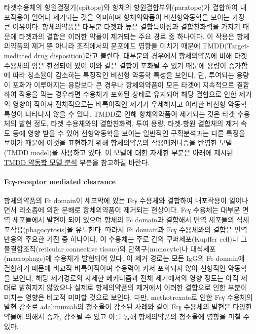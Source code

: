\documentclass[
  11pt,
  krantz2, a4paper, twoside]{krantz}
\theoremstyle{definition}
\theoremstyle{definition}
\theoremstyle{definition}
\theoremstyle{definition}
\theoremstyle{remark}
\begin{document}
타겟수용체의 항원결정기(epitope)와 항체의 항원결합부위(paratope)가 결합하여 내포작용이 일어나 제거되는 것을 의미하며 항체의약품이 비선형약동학을 보이는 가장 큰 이유이다. 항체의약품은 대부분 타겟과 높은 결합특이성과 결합친화력을 가지기 때문에 타겟과의 결합은 이러한 약물이 제거되는 주요 경로 중 하나이다. 이 작용은 항체의약품의 제거 뿐 아니라 조직에서의 분포에도 영향을 미치기 때문에 TMDD(Target-mediated drug disposition)라고 불린다.    
대부분의 경우에서 항체의약품에 비해 타겟수용체의 양은 한정되어 있어 이와 같은 결합이 포화될 수 있기 때문에 용량이 증가함에 따라 청소율이 감소하는 특징적인 비선형 약동학 특성을 보인다. 단, 투여되는 용량이 포화가 이루어지는 용량보다 큰 경우나 항체의약품이 모든 타겟에 지속적으로 결합하여 작용을 막는 경우라면 수용체가 포화된 상태로 유지되어 해당 결합으로 인한 제거의 영향이 작아져 전체적으로는 비특이적인 제거가 우세해지고 이러한 비선형 약동학 특성이 나타나지 않을 수 있다. 
TMDD로 인해 항체의약품이 제거되는 것은 타겟 수용체의 발현 정도, 타겟 수용체와의 결합친화력, 투여 용량, 타겟-항원 결합체의 제거 속도 등에 영향 받을 수 있어 선형약동학을 보이는 일반적인 구획분석과는 다른 특징을 보이기 때문에 이것을 표현하기 위해 항체의약품의 작용메커니즘을 반영한 모델(TMDD model)을 사용하고 있다. 이 모델에 대한 자세한 부분은 아래에 제시된 \hyperref[tmdd_model]{TMDD 약동학 모델 분석} 부분을 참고하길 바란다.

\paragraph{Fcγ-receptor mediated clearance}\label{fcux3b3-receptor-mediated-clearance}

항체의약품의 Fc domain이 세포막에 있는 Fcγ 수용체와 결합하여 내포작용이 일어나면서 리소좀에 의한 분해로 항체의약품이 제거되는 현상이다. Fcγ 수용체는 대부분 면역 세포들에서 발현이 되어 있으며 항체의 Fc domain과 결합해서 면역 세포들의 식세포작용(phagocytosis)을 유도한다. 따라서 Fc domain과 Fcγ 수용체와의 결합은 면역 반응의 주요한 기전 중 하나이다.
이 수용체는 주로 간의 쿠퍼세포(Kupffer cell)나 그물결합조직(reticular connective tissue)의 단핵구(monocyte)나 대식세포(macrophage)에 수용체가 발현되어 있다. 이 제거 경로는 모든 IgG의 Fc domain에 결합하기 때문에 비교적 비특이적이며 수용력이 커서 포화되지 않아 선형적인 약동학을 보인다. 해당 제거경로의 자세한 메커니즘과 전체 제거에서의 영향 정도는 아직 제대로 밝혀지지 않았으나 실제로 항체의약품의 제거에서 이러한 결합으로 인한 부분이 미치는 영향은 비교적 미미할 것으로 보인다. 다만, methotrexate로 인한 Fcγ 수용체의 발현 감소로 adalimumab의 청소율이 감소된 사례와 같이 Fcγ 수용체의 발현은 다양한 약물에 의해서 증가, 감소될 수 있고 이를 통해 항체의약품의 청소율에 영향을 미칠 수 있다.
\end{document}
